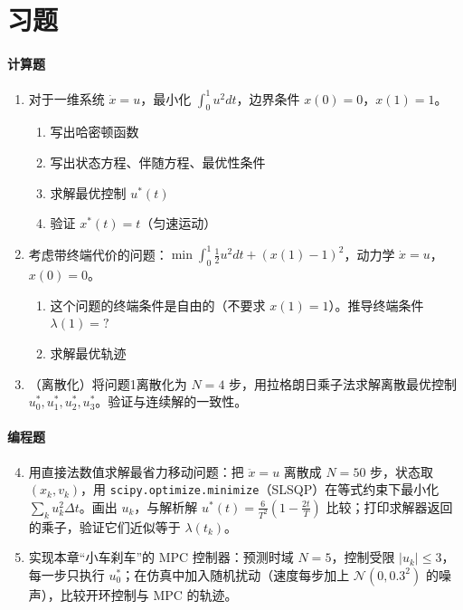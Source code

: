 \section{习题}

\paragraph{计算题}
\begin{enumerate}
    \item 对于一维系统 $\dot{x} = u$，最小化 $\int_0^1 u^2 dt$，边界条件 $x(0) = 0$，$x(1) = 1$。
    \begin{enumerate}
        \item 写出哈密顿函数
        \item 写出状态方程、伴随方程、最优性条件
        \item 求解最优控制 $u^*(t)$
        \item 验证 $x^*(t) = t$（匀速运动）
    \end{enumerate}
    
    \item 考虑带终端代价的问题：$\min \int_0^1 \frac{1}{2}u^2 dt + (x(1) - 1)^2$，动力学 $\dot{x} = u$，$x(0) = 0$。
    \begin{enumerate}
        \item 这个问题的终端条件是自由的（不要求 $x(1) = 1$）。推导终端条件 $\lambda(1) = ?$
        \item 求解最优轨迹
    \end{enumerate}
    
    \item （离散化）将问题1离散化为 $N = 4$ 步，用拉格朗日乘子法求解离散最优控制 $u_0^*, u_1^*, u_2^*, u_3^*$。验证与连续解的一致性。
\end{enumerate}

\paragraph{编程题}
\begin{enumerate}
    \setcounter{enumi}{3}
    \item 用直接法数值求解最省力移动问题：把 $\ddot{x} = u$ 离散成 $N = 50$ 步，状态取 $(x_k, v_k)$，用 \texttt{scipy.optimize.minimize}（SLSQP）在等式约束下最小化 $\sum_k u_k^2 \Delta t$。画出 $u_k$，与解析解 $u^*(t) = \frac{6}{T^2}(1 - \frac{2t}{T})$ 比较；打印求解器返回的乘子，验证它们近似等于 $\lambda(t_k)$。
    
    \item 实现本章“小车刹车”的 MPC 控制器：预测时域 $N = 5$，控制受限 $|u_k| \le 3$，每一步只执行 $u_0^*$；在仿真中加入随机扰动（速度每步加上 $\mathcal{N}(0, 0.3^2)$ 的噪声），比较开环控制与 MPC 的轨迹。
\end{enumerate}

